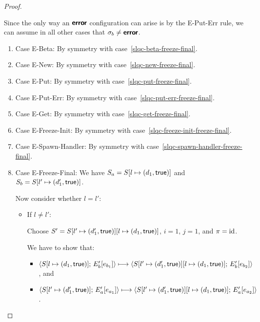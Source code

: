 \begin{proof}
\begin{enumerate}
    Since the only way an $\textbf{\textsf{error}}$ configuration can arise is by the
    {\sc E-Put-Err} rule, we can assume in all other cases that
    $\sigma_b \neq \textbf{\textsf{error}}$.
    \begin{enumerate}
    \item \label{slqc-freeze-final-beta}Case {\sc E-Beta}: By symmetry with case~\ref{slqc-beta-freeze-final}.
    \item \label{slqc-freeze-final-new}Case {\sc E-New}: By symmetry with case~\ref{slqc-new-freeze-final}.
    \item \label{slqc-freeze-final-put}Case {\sc E-Put}: By symmetry with case~\ref{slqc-put-freeze-final}.
    \item \label{slqc-freeze-final-put-err}Case {\sc E-Put-Err}: By symmetry with case~\ref{slqc-put-err-freeze-final}.
    \item \label{slqc-freeze-final-get}Case {\sc E-Get}: By symmetry with case~\ref{slqc-get-freeze-final}.
    \item \label{slqc-freeze-final-freeze-init}Case {\sc E-Freeze-Init}: By symmetry with case~\ref{slqc-freeze-init-freeze-final}.
    \item \label{slqc-freeze-final-spawn-handler}Case {\sc E-Spawn-Handler}: By symmetry with case~\ref{slqc-spawn-handler-freeze-final}.
    \item \label{slqc-freeze-final-freeze-final}Case {\sc
      E-Freeze-Final}: We have $S_a = S[l \mapsto (d_1, \textsf{true})]$
      and $S_b = S[l' \mapsto (d'_1, \textsf{true})]$.

      Now consider whether $l = l'$:
      \begin{itemize}
      \item If $l \neq l'$:

        Choose $S' =
        S[l' \mapsto (d'_1, \textsf{true})][l \mapsto (d_1, \textsf{true})]$,
        $i = 1$, $j = 1$, and $\pi = \mathrm{id}$.

        We have to show that:
        \begin{itemize}
        \item
          $\langle S[l \mapsto (d_1, \textsf{true})];\, E'_b\hspace{-0.5mm}\left[e_{b_1}\right] \rangle
          \longmapsto
          \langle S[l' \mapsto (d'_1, \textsf{true})][l \mapsto (d_1, \textsf{true})];\, E'_b\hspace{-0.5mm}\left[e_{b_2}\right] \rangle$,
          and
        \item
          $\langle S[l' \mapsto (d'_1, \textsf{true})];\, E'_a\hspace{-0.5mm}\left[e_{a_1}\right] \rangle
          \longmapsto
          \langle S[l' \mapsto (d'_1, \textsf{true})][l \mapsto (d_1, \textsf{true})];\, E'_a\hspace{-0.5mm}\left[e_{a_2}\right] \rangle$.
        \end{itemize}


\end{itemize}
\end{enumerate}
\end{enumerate}
\end{proof}

